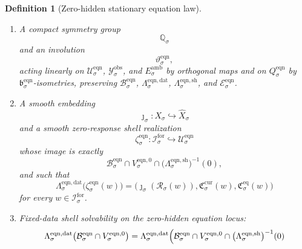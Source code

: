 \documentclass[11pt]{article}
\newcommand{\ForSpace}[1]{\mathcal I_{#1}^{\mathrm{for}}}
\newcommand{\Reduction}[1]{\mathcal R_{#1}}
\newcommand{\CurrentCarrier}[1]{\mathfrak C_{#1}^{\mathrm{cur}}}
\newcommand{\EqCarrier}[1]{\mathfrak C_{#1}^{\mathrm{eq}}}
\newcommand{\VisibleAffine}[1]{\widehat X_{#1}}
\newcommand{\DataSpace}[1]{\mathcal Y_{#1}^{\mathrm{obs}}}
\newcommand{\AmbientTarget}[1]{E_{#1}^{\mathrm{amb}}}
\newcommand{\EqnSpace}[1]{\mathcal U_{#1}^{\mathrm{eqn}}}
\newcommand{\EqnBody}[1]{\mathcal B_{#1}^{\mathrm{eqn}}}
\newcommand{\EqnData}[1]{\Lambda_{#1}^{\mathrm{eqn,dat}}}
\newcommand{\EqnShell}[1]{\Lambda_{#1}^{\mathrm{eqn,sh}}}
\newcommand{\EqnTarget}[1]{Q_{#1}^{\mathrm{eqn}}}
\newcommand{\EqnPair}[1]{\mathfrak b_{#1}^{\mathrm{eqn}}}
\newcommand{\EqnResidual}[1]{\mathcal E_{#1}^{\mathrm{eqn}}}
\newcommand{\EqnZero}[1]{V_{#1}^{\mathrm{eqn},0}}
\newcommand{\EqnHidden}[1]{H_{#1}^{\mathrm{eqn}}}
\newcommand{\EqnLin}[1]{\mathcal N_{#1}^{\mathrm{eqn}}}
\newcommand{\EqnSym}[1]{\mathbb Q_{#1}}
\newcommand{\EqnTime}[1]{\vartheta_{#1}^{\mathrm{eqn}}}
\newcommand{\EqnEmbed}[1]{\zeta_{#1}^{\mathrm{eqn}}}
\newtheorem{definition}{Definition}
\begin{document}
\begin{definition}[Zero-hidden stationary equation law]
\begin{enumerate}
    \[
    \EqnLin{\sigma}:\EqnSpace{\sigma}\to\EqnTarget{\sigma}
    \]
    such that for every \(z\in\EqnZero{\sigma}\),
    \begin{equation}
    D\EqnResidual{\sigma}(z)=\EqnLin{\sigma}.
    \label{eq:eqnlinearization}
    \end{equation}
    Assume moreover that
    \begin{equation}
    \EqnLin{\sigma}(\delta z)=0
    \qquad
    \text{for all }\delta z\in\EqnZero{\sigma},
    \label{eq:eqnzero}
    \end{equation}
    and that there exists \(\lambda_{\sigma}^{\mathrm{eqn}}>0\) with
    \begin{equation}
    \EqnPair{\sigma}\bigl(\EqnLin{\sigma}\eta,\EqnLin{\sigma}\eta\bigr)
    \ge
    \lambda_{\sigma}^{\mathrm{eqn}}\,
    \|\eta\|^{2}
    \qquad
    \text{for all }\eta\in\EqnHidden{\sigma}.
    \label{eq:eqngap}
    \end{equation}
    \item A compact symmetry group
    \[
    \EqnSym{\sigma}
    \]
    and an involution
    \[
    \EqnTime{\sigma},
    \]
    acting linearly on \(\EqnSpace{\sigma}\), \(\DataSpace{\sigma}\), and \(\AmbientTarget{\sigma}\) by orthogonal maps and on \(\EqnTarget{\sigma}\) by \(\EqnPair{\sigma}\)-isometries, preserving \(\EqnBody{\sigma}\), \(\EqnData{\sigma}\), \(\EqnShell{\sigma}\), and \(\EqnResidual{\sigma}\).
    \item A smooth embedding
    \[
    \jmath_{\sigma}:X_{\sigma}\hookrightarrow\VisibleAffine{\sigma}
    \]
    and a smooth zero-response shell realization
    \[
    \EqnEmbed{\sigma}:\ForSpace{\sigma}\hookrightarrow\EqnSpace{\sigma}
    \]
    whose image is exactly
    \[
    \EqnBody{\sigma}\cap
    \EqnZero{\sigma}\cap
    \bigl(\EqnShell{\sigma}\bigr)^{-1}(0),
    \]
    and such that
    \begin{equation}
    \EqnData{\sigma}\bigl(\EqnEmbed{\sigma}(w)\bigr)
    =
    \bigl(
    \jmath_{\sigma}(\Reduction{\sigma}(w)),
    \CurrentCarrier{\sigma}(w),
    \EqCarrier{\sigma}(w)
    \bigr)
    \label{eq:eqncompat}
    \end{equation}
    for every \(w\in\ForSpace{\sigma}\).
    \item Fixed-data shell solvability on the zero-hidden equation locus:
    \begin{equation}
    \EqnData{\sigma}\bigl(
    \EqnBody{\sigma}\cap\EqnZero{\sigma}
    \bigr)
    =
    \EqnData{\sigma}\Bigl(
    \EqnBody{\sigma}\cap
    \EqnZero{\sigma}\cap
    \bigl(\EqnShell{\sigma}\bigr)^{-1}(0)

\end{equation}
\end{enumerate}
\end{definition}
\end{document}
